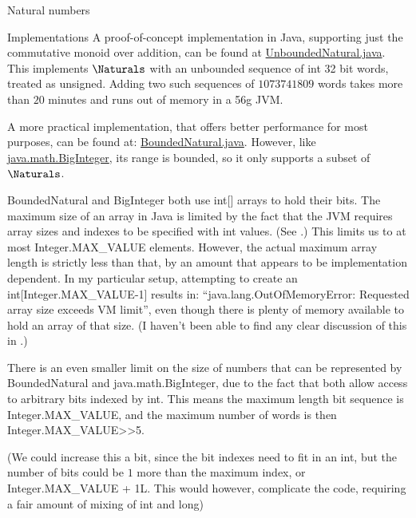 \documentclass[12pt]{PalisadesLakesBook}
\begin{document}
\begin{plSection}{Natural numbers}
\begin{plSection}{Implementations}
A proof-of-concept implementation in Java,
supporting just the commutative monoid over addition, 
can be found at
\href{https://github.com/palisades-lakes/nzqr/blob/main/src/main/java/nzqr/java/numbers/UnboundedNatural.java}
{\javaFont UnboundedNatural.java}.
This implements $\Naturals$ with an unbounded sequence
of {\javaFont int} 32 bit words, treated as unsigned.
Adding two such sequences of $1073741809$ words
takes more than $20$ minutes and 
runs out of memory in a 56g JVM.

A more practical implementation,
that offers better performance for most purposes,
can be found at: 
\href{https://github.com/palisades-lakes/nzqr/blob/main/src/main/java/nzqr/java/numbers/BoundedNatural.java}
{\javaFont BoundedNatural.java}.
However, 
like \href{https://github.com/openjdk/jdk/blob/master/src/java.base/share/classes/java/math/BigInteger.java}
{\javaFont java.math.BigInteger},
its range is bounded, so it only supports a subset of $\Naturals$.

{\javaFont BoundedNatural} and {\javaFont BigInteger}
both use {\javaFont int[]} arrays to hold their bits.
The maximum size of an array in Java is limited
by the fact that the JVM 
requires array sizes and indexes to be specified 
with {\javaFont int} values.
(See .)
This limits us to at most {\javaFont Integer.MAX\_VALUE} elements.
However, the actual maximum array length is strictly less than that,
by an amount that appears to be implementation dependent.
In my particular setup, attempting to create an 
{\javaFont int[Integer.MAX\_VALUE-1]} results in:
``{\javaFont java.lang.OutOfMemoryError: 
Requested array size exceeds VM limit}'',
even though there is plenty of memory available to hold 
an array of that size.
(I haven't been able to find any clear discussion of this in
.)

There is an even smaller limit on the size of numbers that can be
represented by {\javaFont BoundedNatural} and 
{\javaFont java.math.BigInteger},
due to the fact that both allow access to arbitrary bits
indexed by {\javaFont int}.
This means the maximum length bit sequence is 
{\javaFont Integer.MAX\_VALUE},
and the maximum number of words is then
{\javaFont Integer.MAX\_VALUE>>5}.

(We could increase this a bit, since the bit indexes need to fit
in an {\javaFont int}, but the number of bits could be $1$ more
than the maximum index, or {\javaFont Integer.MAX\_VALUE + 1L}.
This would however, complicate the code, requiring a fair amount
of mixing of {\javaFont int} and {\javaFont long})


\end{plSection}
\end{plSection}
\end{document}
